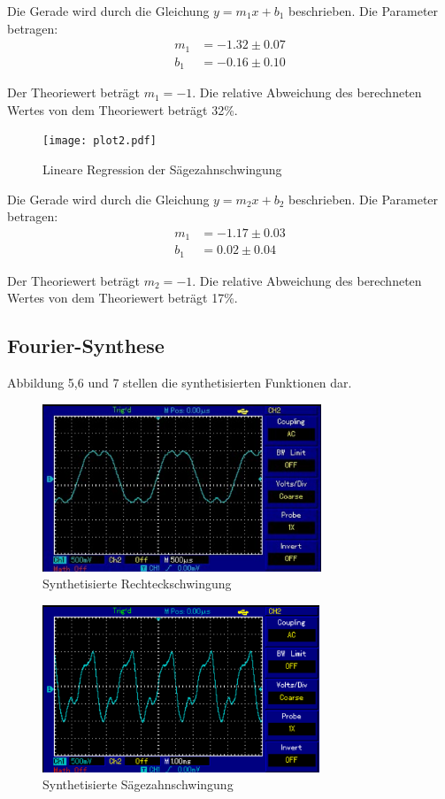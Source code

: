 Die Gerade wird durch die Gleichung $y = m_1x + b_1$ beschrieben. Die Parameter betragen:
\begin{align*}
  m_1 &= -1.32 \pm 0.07 \\
  b_1 &= -0.16 \pm 0.10
\end{align*}

Der Theoriewert beträgt $m_1=-1$. Die relative Abweichung des berechneten Wertes von dem Theoriewert beträgt 32\%.

\begin{figure}
  \centering
  \texttt{[image: plot2.pdf]}
  \caption{Lineare Regression der Sägezahnschwingung}
  \label{fig:saegezahn}
\end{figure}

Die Gerade wird durch die Gleichung $y = m_2x + b_2$ beschrieben. Die Parameter betragen:
\begin{align*}
  m_1 &= -1.17 \pm 0.03 \\
  b_1 &= 0.02 \pm 0.04
\end{align*}

Der Theoriewert beträgt $m_2=-1$. Die relative Abweichung des berechneten Wertes von dem Theoriewert beträgt 17\%.

\subsection{Fourier-Synthese}
Abbildung 5,6 und 7 stellen die synthetisierten Funktionen dar.

\begin{figure}[H]
  \centering
  \includegraphics[height=5cm]{rechteck.PNG}
  \caption{Synthetisierte Rechteckschwingung}
  \label{fig:rechteck}
\end{figure}


\begin{figure}[H]
  \centering
  \includegraphics[height=5cm]{saegezahn.PNG}
  \caption{Synthetisierte Sägezahnschwingung}
  \label{fig:saegezahn}
\end{figure}


